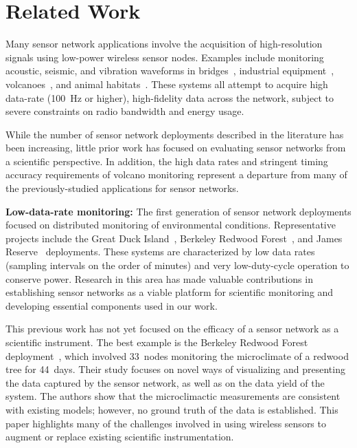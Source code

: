 \section{Related Work}
\label{chapter-relatedwork}


Many sensor network applications involve the acquisition
of high-resolution signals using low-power wireless sensor nodes. Examples
include monitoring acoustic, seismic, and vibration waveforms in
bridges~\cite{ggb-ipsn07}, industrial equipment~\cite{intel-northseasensys}, 
volcanoes~\cite{volcano-osdi06}, and animal
habitats~\cite{girod-ipsn07,enviromic}.  These systems all attempt to acquire
high data-rate (100~Hz or higher), high-fidelity data across the network,
subject to severe constraints on radio bandwidth and energy usage.


While the number of sensor network deployments described in the literature
has been increasing, little prior work has focused on evaluating sensor
networks from a scientific perspective.  In addition, the high data rates and
stringent timing accuracy requirements of volcano monitoring represent a
departure from many of the previously-studied applications for sensor
networks.

{\bf Low-data-rate monitoring:} The first generation of sensor network
deployments focused on distributed monitoring of environmental conditions.
Representative projects include the Great Duck
Island~\cite{spm:04habitat,polastre-masters,mainwaring-habitat}, Berkeley
Redwood Forest~\cite{berkeley-redwoods}, and James
Reserve~\cite{cerpa-habitat} deployments. These systems are characterized by
low data rates (sampling intervals on the order of minutes) and very
low-duty-cycle operation to conserve power.  Research in this area has made
valuable contributions in establishing sensor networks as a viable platform
for scientific monitoring and developing essential components used in our
work. 

This previous work has not yet focused on the efficacy of a sensor network as
a scientific instrument.  The best example is the Berkeley Redwood Forest
deployment~\cite{berkeley-redwoods}, which involved 33~nodes monitoring the
microclimate of a redwood tree for 44~days.  Their study focuses on novel
ways of visualizing and presenting the data captured by the sensor network,
as well as on the data yield of the system. The authors show that the
microclimactic measurements are consistent with existing models; however, no
ground truth of the data is established. This paper highlights many of the
challenges involved in using wireless sensors to augment or replace existing
scientific instrumentation.


